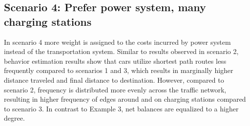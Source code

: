 \subsection*{Scenario 4: Prefer power system, many charging stations}

In scenario 4 more weight is assigned to the costs incurred by power system instead of the transportation system. Similar to results observed in scenario 2, behavior estimation results show that cars utilize shortest path routes less frequently compared to scenarios 1 and 3, which results in marginally higher distance traveled and final distance to destination. However, compared to scenario 2, frequency is distributed more evenly across the traffic network, resulting in higher frequency of edges around and on charging stations compared to scenario 3. In contrast to Example 3, net balances are equalized to a higher degree.